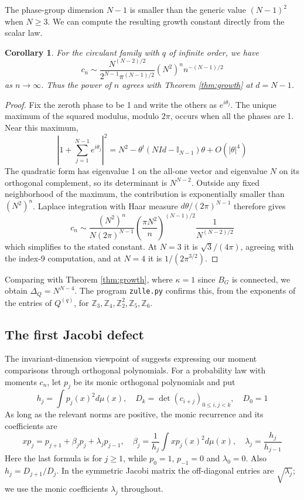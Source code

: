 \documentclass[11pt,reqno]{amsart}
\newtheorem{cor}[thm]{Corollary}
\theoremstyle{definition}
\numberwithin{equation}{section}
\begin{document}
The phase-group dimension $N-1$ is smaller than the generic value $(N-1)^2$ when $N\geq3$. We can compute the resulting growth constant directly from the scalar law.

\begin{cor}\label{cor:circulant-growth}
For the circulant family with $q$ of infinite order, we have
$$c_n\sim\frac{N^{(N-2)/2}}{2^{N-1}\pi^{(N-1)/2}}(N^2)^nn^{-(N-1)/2}$$
as $n\to\infty$. Thus the power of $n$ agrees with Theorem \ref{thm:growth} at $d=N-1$.
\end{cor}
\begin{proof}
Fix the zeroth phase to be 1 and write the others as $e^{i\theta_j}$. The unique maximum of the squared modulus, modulo $2\pi$, occurs when all the phases are 1. Near this maximum,
$$\left|1+\sum_{j=1}^{N-1}e^{i\theta_j}\right|^2=N^2-\theta^t(NId-\mathbb I_{N-1})\theta+O(|\theta|^4)$$
The quadratic form has eigenvalue 1 on the all-one vector and eigenvalue $N$ on its orthogonal complement, so its determinant is $N^{N-2}$. Outside any fixed neighborhood of the maximum, the contribution is exponentially smaller than $(N^2)^n$. Laplace integration with Haar measure $d\theta/(2\pi)^{N-1}$ therefore gives
$$c_n\sim\frac{(N^2)^n}{N(2\pi)^{N-1}}\left(\frac{\pi N^2}n\right)^{(N-1)/2}\frac1{N^{(N-2)/2}}$$
which simplifies to the stated constant. At $N=3$ it is $\sqrt3/(4\pi)$, agreeing with the index-9 computation, and at $N=4$ it is $1/(2\pi^{3/2})$.
\end{proof}

Comparing with Theorem \ref{thm:growth}, where $\kappa=1$ since $B_G$ is connected, we obtain $\Delta_Q=N^{N-4}$. The program \texttt{zulle.py} confirms this, from the exponents of the entries of $Q^{(q)}$, for $\mathbb Z_3,\mathbb Z_4,\mathbb Z_2^2,\mathbb Z_5,\mathbb Z_6$.

\subsection{The first Jacobi defect}

The invariant-dimension viewpoint of \cite[Sections 10 and 11]{BP26} suggests expressing our moment comparisons through orthogonal polynomials. For a probability law with moments $c_n$, let $p_j$ be its monic orthogonal polynomials and put
$$h_j=\int p_j(x)^2d\mu(x),\quad D_k=\det(c_{i+j})_{0\leq i,j<k},\quad D_0=1$$
As long as the relevant norms are positive, the monic recurrence and its coefficients are
$$xp_j=p_{j+1}+\beta_jp_j+\lambda_jp_{j-1},\quad \beta_j=\frac1{h_j}\int xp_j(x)^2d\mu(x),\quad \lambda_j=\frac{h_j}{h_{j-1}}$$
Here the last formula is for $j\geq1$, while $p_0=1$, $p_{-1}=0$ and $\lambda_0=0$. Also $h_j=D_{j+1}/D_j$. In the symmetric Jacobi matrix the off-diagonal entries are $\sqrt{\lambda_j}$; we use the monic coefficients $\lambda_j$ throughout.
\end{document}
